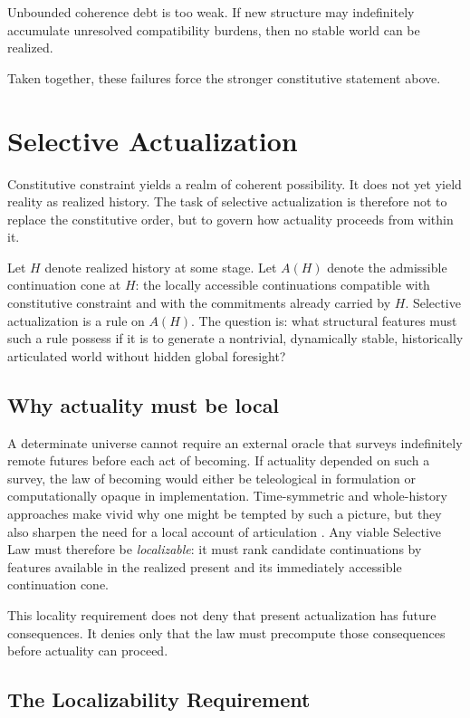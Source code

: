 \documentclass[11pt]{article}
\theoremstyle{foundation}
\begin{document}
Unbounded coherence debt is too weak. If new structure may indefinitely accumulate unresolved compatibility burdens, then no stable world can be realized.

Taken together, these failures force the stronger constitutive statement above.

\section{Selective Actualization}

Constitutive constraint yields a realm of coherent possibility. It does not yet yield reality as realized history. The task of selective actualization is therefore not to replace the constitutive order, but to govern how actuality proceeds from within it.

Let $H$ denote realized history at some stage. Let $A(H)$ denote the admissible continuation cone at $H$: the locally accessible continuations compatible with constitutive constraint and with the commitments already carried by $H$. Selective actualization is a rule on $A(H)$. The question is: what structural features must such a rule possess if it is to generate a nontrivial, dynamically stable, historically articulated world without hidden global foresight?

\subsection{Why actuality must be local}

A determinate universe cannot require an external oracle that surveys indefinitely remote futures before each act of becoming. If actuality depended on such a survey, the law of becoming would either be teleological in formulation or computationally opaque in implementation. Time-symmetric and whole-history approaches make vivid why one might be tempted by such a picture, but they also sharpen the need for a local account of articulation \citep{Price1996,WheelerFeynman1945,WheelerFeynman1949}. Any viable Selective Law must therefore be \emph{localizable}: it must rank candidate continuations by features available in the realized present and its immediately accessible continuation cone.

This locality requirement does not deny that present actualization has future consequences. It denies only that the law must precompute those consequences before actuality can proceed.

\subsection{The Localizability Requirement}
\end{document}

